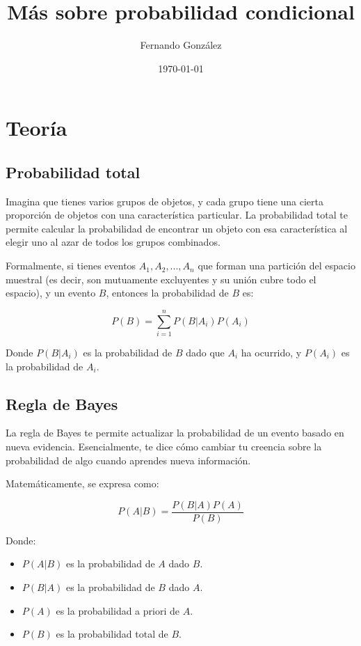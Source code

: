 \documentclass[letterpaper, 12pt]{article}
\title{Más sobre probabilidad condicional}
\author{Fernando González}
\date{\today}
\begin{document}
	
	\maketitle
	
	\section{Teoría}
	
	\subsection{Probabilidad total}
	
	Imagina que tienes varios grupos de objetos, y cada grupo tiene una cierta proporción de objetos con una característica particular. La probabilidad total te permite calcular la probabilidad de encontrar un objeto con esa característica al elegir uno al azar de todos los grupos combinados.
	
	Formalmente, si tienes eventos $A_1, A_2, ..., A_n$ que forman una partición del espacio muestral (es decir, son mutuamente excluyentes y su unión cubre todo el espacio), y un evento $B$, entonces la probabilidad de $B$ es:
	
	\[ P(B) = \sum_{i=1}^{n} P(B|A_i)P(A_i) \]
	
	Donde $P(B|A_i)$ es la probabilidad de $B$ dado que $A_i$ ha ocurrido, y $P(A_i)$ es la probabilidad de $A_i$.
	
	\subsection{Regla de Bayes}
	
	La regla de Bayes te permite actualizar la probabilidad de un evento basado en nueva evidencia. Esencialmente, te dice cómo cambiar tu creencia sobre la probabilidad de algo cuando aprendes nueva información.
	
	Matemáticamente, se expresa como:
	
	\[ P(A|B) = \frac{P(B|A)P(A)}{P(B)} \]
	
	Donde:
	\begin{itemize}
		\item $P(A|B)$ es la probabilidad de $A$ dado $B$.
		\item $P(B|A)$ es la probabilidad de $B$ dado $A$.
		\item $P(A)$ es la probabilidad a priori de $A$.
		\item $P(B)$ es la probabilidad total de $B$.
	\end{itemize}
	
\end{document}
